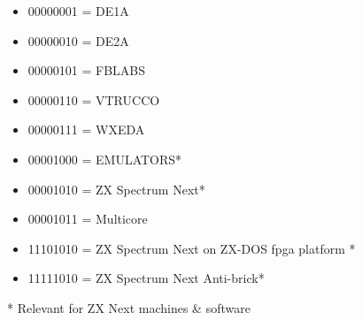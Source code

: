 \begin{itemize}
\item 00000001 = DE1A
\item 00000010 = DE2A
\item 00000101 = FBLABS
\item 00000110 = VTRUCCO
\item 00000111 = WXEDA
\item 00001000 = EMULATORS*
\item 00001010 = ZX Spectrum Next*
\item 00001011 = Multicore
\item 11101010 = ZX Spectrum Next on ZX-DOS fpga platform *
\item 11111010 = ZX Spectrum Next Anti-brick*
\end{itemize}
* Relevant for ZX Next machines \& software


